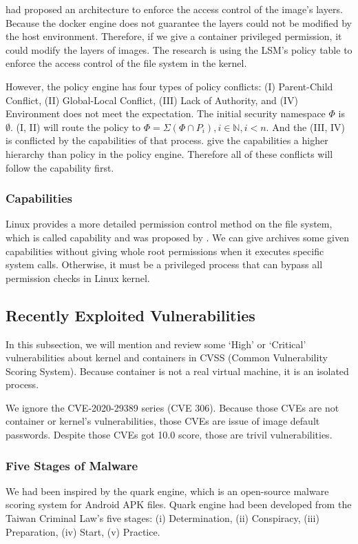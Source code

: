 \textcite{9184912} had proposed an architecture to enforce the access
control of the image's layers. Because the docker engine does not guarantee the layers could
not be modified by the host environment. Therefore, if we give a container privileged
permission, it could modify the layers of images. The research \cite{9184912} is using
the LSM's policy table to enforce the access control of the file system in the kernel.

However, the policy engine has four types of policy conflicts: (\RN{1}) Parent-Child Conflict,
(\RN{2}) Global-Local Conflict, (\RN{3}) Lack of Authority, and  (\RN{4}) Environment does not
meet the expectation. The initial security namespace $\Phi$ is $\emptyset$. (\RN{1},
\RN{2}) will route the policy to $\Phi = \Sigma (\Phi \cap P_i), i \in \mathbb{N}, i < n$.
And the (\RN{3}, \RN{4}) is conflicted by the capabilities of that process. \textcite{217614}
give the capabilities a higher hierarchy than policy in the policy engine. Therefore
all of these conflicts will follow the capability first.

\subsubsection{Capabilities}
\label{Capabilities}
Linux provides a more detailed permission control method on the file system, which is called
capability and was proposed by \citeauthor{6234805}. We can give archives some given capabilities
without giving whole root permissions when it executes specific system calls. Otherwise, it
must be a privileged process that can bypass all permission checks in Linux kernel.

\subsection{Recently Exploited Vulnerabilities}
In this subsection, we will mention and review some `High' or `Critical' vulnerabilities
about kernel and containers in CVSS (Common Vulnerability Scoring System).
Because container is not a real virtual machine, it is an isolated process.

We ignore the CVE-2020-29389 series (CVE 306). Because those CVEs are not container or kernel's
vulnerabilities, those CVEs are issue of image default passwords. Despite those CVEs got 10.0 score,
those are trivil vulnerabilities.

\subsubsection{Five Stages of Malware}
\label{Five_stage_of_malware}
We had been inspired by the quark engine, %
which is an open-source malware scoring system for Android APK files. Quark
engine had been developed from the Taiwan Criminal Law's five stages:
(\Rn{1}) Determination, (\Rn{2}) Conspiracy, (\Rn{3}) Preparation, (\Rn{4}) Start, (\Rn{5}) Practice.


